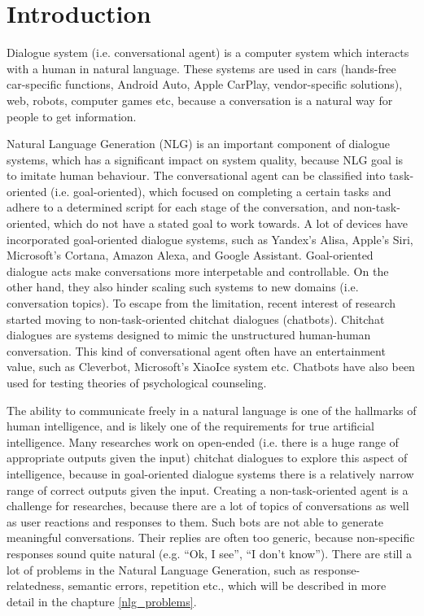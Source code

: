 \chapter{Introduction}\label{introduction}
Dialogue system (i.e. conversational agent) is a computer system which interacts with a human in natural language. These systems are used in cars (hands-free car-specific functions, Android Auto, Apple CarPlay, vendor-specific solutions), web, robots, computer games etc, because a conversation is a natural way for people to get information. 


Natural Language Generation (NLG) is an important component of dialogue systems, which has a significant impact on system quality, because NLG goal is to imitate human behaviour. The conversational agent can be classified into task-oriented (i.e. goal-oriented), which focused on completing a certain tasks and adhere to a determined script for each stage of the conversation, and non-task-oriented, which do not have a stated goal to work towards. A lot of devices have incorporated goal-oriented dialogue systems, such as Yandex’s Alisa, Apple’s Siri, Microsoft’s Cortana, Amazon Alexa, and Google Assistant. Goal-oriented dialogue acts make conversations more interpetable and controllable. On the other hand, they also hinder scaling such systems to new domains (i.e. conversation topics). To escape from the limitation, recent interest of research started moving to non-task-oriented chitchat dialogues (chatbots). Chitchat dialogues are systems designed to mimic the unstructured human-human conversation. This kind of conversational agent often have an entertainment value, such as Cleverbot, Microsoft's XiaoIce system etc. Chatbots have also been used for testing theories of psychological counseling.

The ability to communicate freely in a natural language is one of the hallmarks of human intelligence, and is likely one of the requirements for true artificial intelligence. Many researches work on open-ended (i.e. there is a huge range of appropriate outputs given the input) chitchat dialogues to explore this aspect of intelligence, because in goal-oriented dialogue systems there is a relatively narrow range of correct outputs given the input. 
Creating a non-task-oriented agent is a challenge for researches, because there are a lot of topics of conversations as well as user reactions and responses to them. Such bots are not able to generate meaningful conversations. Their replies are often too generic, because non-specific responses sound quite natural (e.g. ``Ok, I see'', ``I don't know''). There are still a lot of problems in the Natural Language Generation, such as response-relatedness, semantic errors, repetition etc., which will be described in more detail in the chapture \ref{nlg_problems}. 


